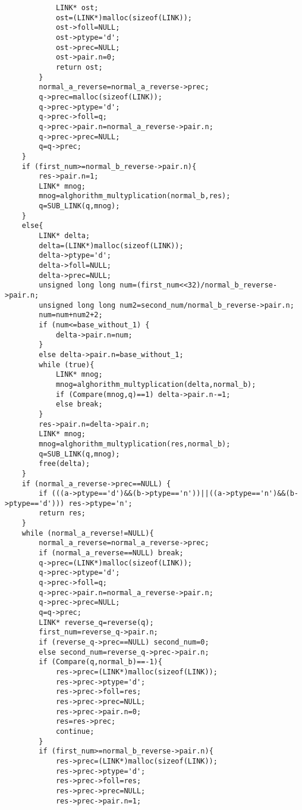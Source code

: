 \documentclass[14pt, russian]{scrartcl}
\begin{document}
\begin{code}
\begin{verbatim}
            LINK* ost;
            ost=(LINK*)malloc(sizeof(LINK));
            ost->foll=NULL;
            ost->ptype='d';
            ost->prec=NULL;
            ost->pair.n=0;
            return ost;
        }
        normal_a_reverse=normal_a_reverse->prec;
        q->prec=malloc(sizeof(LINK));
        q->prec->ptype='d';
        q->prec->foll=q;
        q->prec->pair.n=normal_a_reverse->pair.n;
        q->prec->prec=NULL;
        q=q->prec;
    }
    if (first_num>=normal_b_reverse->pair.n){
        res->pair.n=1;
        LINK* mnog;
        mnog=alghorithm_multyplication(normal_b,res);
        q=SUB_LINK(q,mnog);
    }
    else{
        LINK* delta;
        delta=(LINK*)malloc(sizeof(LINK));
        delta->ptype='d';
        delta->foll=NULL;
        delta->prec=NULL;
        unsigned long long num=(first_num<<32)/normal_b_reverse->pair.n;
        unsigned long long num2=second_num/normal_b_reverse->pair.n;
        num=num+num2+2;
        if (num<=base_without_1) {
            delta->pair.n=num;
        }
        else delta->pair.n=base_without_1;
        while (true){
            LINK* mnog;
            mnog=alghorithm_multyplication(delta,normal_b);
            if (Compare(mnog,q)==1) delta->pair.n-=1;
            else break;
        }
        res->pair.n=delta->pair.n;
        LINK* mnog;
        mnog=alghorithm_multyplication(res,normal_b);
        q=SUB_LINK(q,mnog);
        free(delta);
    }
    if (normal_a_reverse->prec==NULL) {
        if (((a->ptype=='d')&&(b->ptype=='n'))||((a->ptype=='n')&&(b->ptype=='d'))) res->ptype='n';
        return res;
    }
    while (normal_a_reverse!=NULL){
        normal_a_reverse=normal_a_reverse->prec;
        if (normal_a_reverse==NULL) break;
        q->prec=(LINK*)malloc(sizeof(LINK));
        q->prec->ptype='d';
        q->prec->foll=q;
        q->prec->pair.n=normal_a_reverse->pair.n;
        q->prec->prec=NULL;
        q=q->prec;
        LINK* reverse_q=reverse(q);
        first_num=reverse_q->pair.n;
        if (reverse_q->prec==NULL) second_num=0;
        else second_num=reverse_q->prec->pair.n;
        if (Compare(q,normal_b)==-1){
            res->prec=(LINK*)malloc(sizeof(LINK));
            res->prec->ptype='d';
            res->prec->foll=res;
            res->prec->prec=NULL;
            res->prec->pair.n=0;
            res=res->prec;
            continue;
        }
        if (first_num>=normal_b_reverse->pair.n){
            res->prec=(LINK*)malloc(sizeof(LINK));
            res->prec->ptype='d';
            res->prec->foll=res;
            res->prec->prec=NULL;
            res->prec->pair.n=1;

\end{verbatim}
\end{code}
\end{document}
